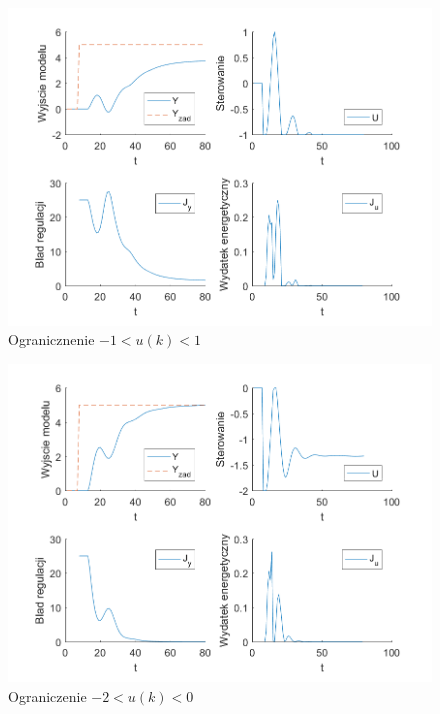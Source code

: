 \documentclass[a4paper, 10pt]{article}
\begin{document}
	\begin{figure}[H]
				\centering
				\includegraphics[width=0.9\linewidth]{z7_200_-1_1}
				\caption{Ogranicznenie  $-1<u(k)<1$}
				\label{fig:z7_200_-1_1}
				\end{figure}
	\begin{figure}[H]
				\centering
				\includegraphics[width=0.9\linewidth]{z7_200_-2_0}
				\caption{Ograniczenie $-2<u(k)<0$}
				\label{fig:z7_200_-2_0}
				\end{figure}
	
\end{document}

